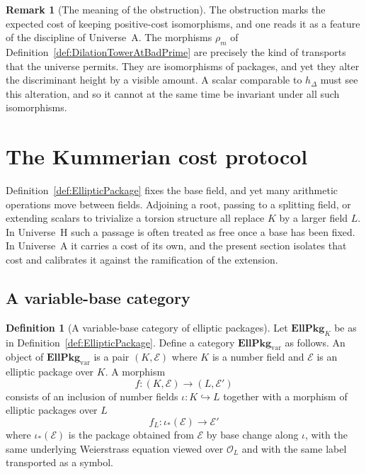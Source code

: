 \documentclass[10pt, reqno]{amsart}
\theoremstyle{plain}
\theoremstyle{definition}
\newtheorem{definition}[theorem]{Definition}
\newtheorem{remark}[theorem]{Remark}
\theoremstyle{plain}
\begin{document}
\begin{remark}[The meaning of the obstruction]\label{rem:MeaningOfLogVolumeObstruction}
The obstruction marks the expected cost of keeping positive-cost isomorphisms, and one reads it as a feature of the discipline of Universe~A. The morphisms $\rho_m$ of Definition~\ref{def:DilationTowerAtBadPrime} are precisely the kind of transports that the universe permits. They are isomorphisms of packages, and yet they alter the discriminant height by a visible amount. A scalar comparable to $h_\Delta$ must see this alteration, and so it cannot at the same time be invariant under all such isomorphisms.
\end{remark}

\section{The Kummerian cost protocol}\label{sec:Kummer}

Definition~\ref{def:EllipticPackage} fixes the base field, and yet many arithmetic operations move between fields. Adjoining a root, passing to a splitting field, or extending scalars to trivialize a torsion structure all replace $K$ by a larger field $L$. In Universe~H such a passage is often treated as free once a base has been fixed. In Universe~A it carries a cost of its own, and the present section isolates that cost and calibrates it against the ramification of the extension.

\subsection{A variable-base category}\label{subsec:EllPkgVar}

\begin{definition}[A variable-base category of elliptic packages]\label{def:EllPkgVar}
Let $\mathbf{EllPkg}_{K}$ be as in Definition~\ref{def:EllipticPackage}. Define a category $\mathbf{EllPkg}_{\mathrm{var}}$ as follows. An object of $\mathbf{EllPkg}_{\mathrm{var}}$ is a pair $(K,\mathcal{E})$ where $K$ is a number field and $\mathcal{E}$ is an elliptic package over $K$. A morphism
\[
  f \colon (K,\mathcal{E}) \longrightarrow (L,\mathcal{E}')
\]
consists of an inclusion of number fields $\iota \colon K \hookrightarrow L$ together with a morphism of elliptic packages over $L$
\[
  f_L \colon \iota_\ast(\mathcal{E}) \longrightarrow \mathcal{E}'
\]
where $\iota_\ast(\mathcal{E})$ is the package obtained from $\mathcal{E}$ by base change along $\iota$, with the same underlying Weierstrass equation viewed over $\mathcal{O}_L$ and with the same label transported as a symbol.
\end{definition}
\end{document}
